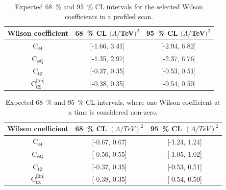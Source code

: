 \documentclass[letterpaper,11pt]{article}
\def\ctZ{C$_\text{tZ}$\xspace}
\def\ctZI{C$_\text{tZ}^\text{[Im]}$\xspace}
\def\cpt{C$_{\phi \text{t}}$\xspace}
\def\cpQM{C$_{\phi \text{Q}}$\xspace}
\def\TeV{TeV\xspace}
\begin{document}
\begin{table}[h]
\caption{Expected 68~\% and 95~\% CL intervals for the selected Wilson coefficients in a profiled scan.}\label{tab:proflimits}
\begin{center}
\begin{tabular}{c|c|c}
\hline
Wilson coefficient & 68~\% CL $(\Lambda/$\TeV$)^2$ & 95~\% CL $(\Lambda/$\TeV$)^2$ \\
\hline
\hline
\cpt   & [-1.66, 3.41]                 & [-2.94, 6.82]                 \\ 
\hline
\cpQM  & [-1.35, 2.97]                 & [-2.37, 6.76]                 \\ 
\hline
\ctZ   & [-0.37, 0.35]                 & [-0.53, 0.51]                 \\ 
\hline
\ctZI  & [-0.38, 0.35]                 & [-0.54, 0.50]                 \\ 
\hline
\end{tabular}
\end{center}
\end{table}

\begin{table}[h]
\caption{Expected 68~\% and 95~\% CL intervals, where one Wilson coefficient at a time is considered non-zero.}\label{tab:limits}
\begin{center}
\begin{tabular}{c|c|c}
\hline
Wilson coefficient & 68~\% CL $(\Lambda/\TeV)^2$ & 95~\% CL $(\Lambda/\TeV)^2$ \\
\hline
\hline
\cpt  & [-0.67, 0.67]                 & [-1.24, 1.24]                 \\
\hline
\cpQM & [-0.56, 0.55]                 & [-1.05, 1.02]                 \\
\hline
\ctZ  & [-0.37, 0.35]                 & [-0.53, 0.51]                 \\
\hline
\ctZI & [-0.38, 0.35]                 & [-0.54, 0.50]                 \\
\hline
\end{tabular}
\end{center}
\end{table}




\clearpage


\end{document}
